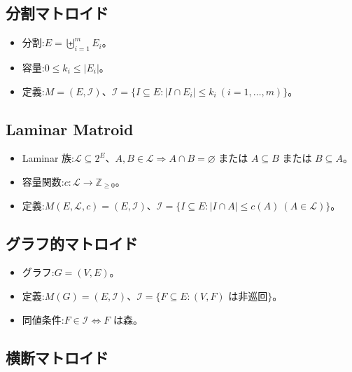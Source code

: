 \documentclass[a4paper, 11pt, dvipdfmx]{jsarticle}
\theoremstyle{definition}
\begin{document}
\subsection[分割マトロイド]{分割マトロイド~\citep{s2}}
\label{sec:partition-matroid}

\begin{itemize}
  \item 分割:$E = \biguplus_{i=1}^m E_i$。
  \item 容量:$0 \leq k_i \leq \lvert E_i \rvert$。
  \item 定義:$M = (E, \mathcal{I})$、$\mathcal{I} = \{I \subseteq E : \lvert I \cap E_i \rvert \leq k_i\ (i = 1, \ldots, m)\}$。
\end{itemize}

\subsection[Laminar Matroid]{Laminar Matroid~\citep{s3}}
\label{sec:laminar-matroid}

\begin{itemize}
  \item Laminar 族:$\mathcal{L} \subseteq 2^E$、$A,B \in \mathcal{L} \Longrightarrow A \cap B = \varnothing$ または $A \subseteq B$ または $B \subseteq A$。
  \item 容量関数:$c \colon \mathcal{L} \to \mathbb{Z}_{\geq 0}$。
  \item 定義:$M(E, \mathcal{L}, c) = (E, \mathcal{I})$、$\mathcal{I} = \{I \subseteq E : \lvert I \cap A \rvert \leq c(A)\ (A \in \mathcal{L})\}$。
\end{itemize}

\subsection[グラフ的マトロイド]{グラフ的マトロイド~\citep{s4}}
\label{sec:graphic-matroid}

\begin{itemize}
  \item グラフ:$G = (V, E)$。
  \item 定義:$M(G) = (E, \mathcal{I})$、$\mathcal{I} = \{F \subseteq E : (V, F) \text{ は非巡回}\}$。
  \item 同値条件:$F \in \mathcal{I} \Longleftrightarrow F$ は森。
\end{itemize}

\subsection[横断マトロイド]{横断マトロイド~\citep{s5}}
\label{sec:transversal-matroid}
\end{document}
